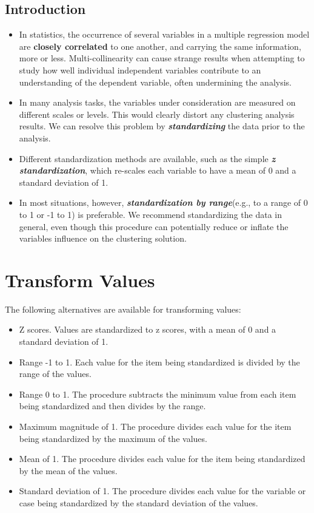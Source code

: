 \documentclass[]{report}
\begin{document}
\subsection*{Introduction}
\begin{itemize}
\item
In statistics, the occurrence of several  variables in a multiple regression model are \textbf{closely correlated} to one another, and carrying the same information, more or less. Multi-collinearity can cause strange results when attempting to study how well individual independent variables contribute to an understanding of the dependent variable, often undermining the analysis.

\item In many analysis tasks, the variables under consideration are measured on
different scales or levels. This would
clearly distort any clustering analysis results. We can resolve this problem by \textbf{\textit{standardizing}}
the data prior to the analysis.

\item Different standardization methods are available, such as the simple \textbf{\textit{z standardization}},
which re-scales each variable to have a mean of 0 and a standard deviation of 1.

\item In most situations, however, \textbf{\textit{standardization by range}}(e.g., to a
range of 0 to 1 or -1 to 1) is preferable. We recommend standardizing the data
in general, even though this procedure can potentially reduce or inflate the variables influence
on the clustering solution.
\end{itemize}
\section*{Transform Values}
The following alternatives are available for transforming values:
\begin{itemize}
	\item 	Z scores. Values are standardized to z scores, with a mean of 0 and a standard deviation of 1. 
	\item 	Range -1 to 1. Each value for the item being standardized is divided by the range of the values. 
	\item 	Range 0 to 1. The procedure subtracts the minimum value from each item being standardized and then divides by the range. 
	\item 	Maximum magnitude of 1. The procedure divides each value for the item being standardized by the maximum of the values. 
	\item 	Mean of 1. The procedure divides each value for the item being standardized by the mean of the values. 
	\item 	Standard deviation of 1. The procedure divides each value for the variable or case being standardized by the standard deviation of the values.
\end{itemize}
\end{document}
